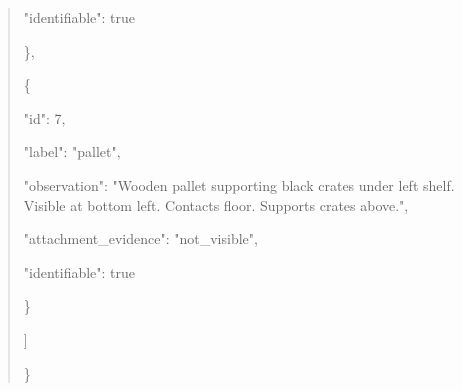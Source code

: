 \documentclass[10pt,a4paper]{article}
\begin{document}
\begin{quote}
      "identifiable":\allowbreak{} true\par
    \},\allowbreak{}\par
    \{\par
      "id":\allowbreak{} 7,\allowbreak{}\par
      "label":\allowbreak{} "pallet",\allowbreak{}\par
      "observation":\allowbreak{} "Wooden pallet supporting black crates under left shelf. Visible at bottom left. Contacts floor. Supports crates above.",\allowbreak{}\par
      "attachment\_evidence":\allowbreak{} "not\_visible",\allowbreak{}\par
      "identifiable":\allowbreak{} true\par
    \}\par
  ]\par
\}
\end{quote}
\end{document}
